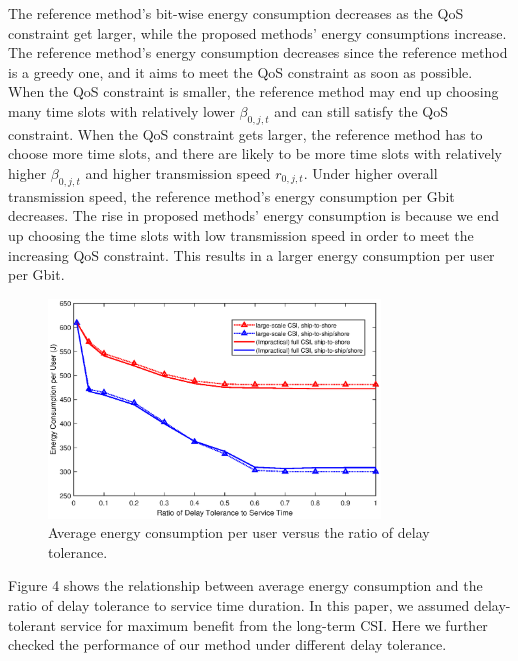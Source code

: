 \documentclass[conference]{IEEEtran}
\begin{document}
The reference method's bit-wise energy consumption decreases as the QoS constraint get larger, while the proposed methods' energy consumptions increase. The reference method's energy consumption decreases since the reference method is a greedy one, and it aims to meet the QoS constraint as soon as possible. When the QoS constraint is smaller, the reference method may end up choosing many time slots with relatively lower ${\beta _{0,j,t}}$ and can still satisfy the QoS constraint. When the QoS constraint gets larger, the reference method has to choose more time slots, and there are likely to be more time slots with relatively higher ${\beta _{0,j,t}}$ and higher transmission speed ${r_{0,j,t}}$. Under higher overall transmission speed, the reference method's energy consumption per Gbit decreases. The rise in proposed methods' energy consumption is because we end up choosing the time slots with low transmission speed in order to meet the increasing QoS constraint. This results in a larger energy consumption per user per Gbit. 




\begin{figure} [htb]
\begin{center}
\includegraphics*[width=8.8cm]{delays.eps}
\end{center}
\vspace*{-4mm} 
\caption{Average energy consumption per user versus the ratio of delay tolerance.} \label{fig:4}
\vspace*{-2mm} 
\end{figure}

Figure 4 shows the relationship between average energy consumption and the ratio of delay tolerance to service time duration. In this paper, we assumed delay-tolerant service for maximum benefit from the long-term CSI. Here we further checked the performance of our method under different delay tolerance.
\end{document}
